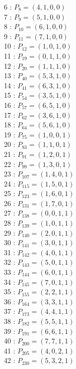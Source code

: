\documentclass{article}
\begin{document}
{\begin{multicols}{3}
6 : $P_{8}=( 4, 1, 0, 0 )$\\
7 : $P_{9}=( 5, 1, 0, 0 )$\\
8 : $P_{10}=( 6, 1, 0, 0 )$\\
9 : $P_{11}=( 7, 1, 0, 0 )$\\
10 : $P_{12}=( 1, 0, 1, 0 )$\\
11 : $P_{19}=( 0, 1, 1, 0 )$\\
12 : $P_{20}=( 1, 1, 1, 0 )$\\
13 : $P_{40}=( 5, 3, 1, 0 )$\\
14 : $P_{41}=( 6, 3, 1, 0 )$\\
15 : $P_{54}=( 3, 5, 1, 0 )$\\
16 : $P_{57}=( 6, 5, 1, 0 )$\\
17 : $P_{62}=( 3, 6, 1, 0 )$\\
18 : $P_{64}=( 5, 6, 1, 0 )$\\
19 : $P_{75}=( 1, 0, 0, 1 )$\\
20 : $P_{83}=( 1, 1, 0, 1 )$\\
21 : $P_{91}=( 1, 2, 0, 1 )$\\
22 : $P_{99}=( 1, 3, 0, 1 )$\\
23 : $P_{107}=( 1, 4, 0, 1 )$\\
24 : $P_{115}=( 1, 5, 0, 1 )$\\
25 : $P_{123}=( 1, 6, 0, 1 )$\\
26 : $P_{131}=( 1, 7, 0, 1 )$\\
27 : $P_{138}=( 0, 0, 1, 1 )$\\
28 : $P_{139}=( 1, 0, 1, 1 )$\\
29 : $P_{140}=( 2, 0, 1, 1 )$\\
30 : $P_{141}=( 3, 0, 1, 1 )$\\
31 : $P_{142}=( 4, 0, 1, 1 )$\\
32 : $P_{143}=( 5, 0, 1, 1 )$\\
33 : $P_{144}=( 6, 0, 1, 1 )$\\
34 : $P_{145}=( 7, 0, 1, 1 )$\\
35 : $P_{155}=( 2, 2, 1, 1 )$\\
36 : $P_{164}=( 3, 3, 1, 1 )$\\
37 : $P_{173}=( 4, 4, 1, 1 )$\\
38 : $P_{182}=( 5, 5, 1, 1 )$\\
39 : $P_{191}=( 6, 6, 1, 1 )$\\
40 : $P_{200}=( 7, 7, 1, 1 )$\\
41 : $P_{205}=( 4, 0, 2, 1 )$\\
42 : $P_{230}=( 5, 3, 2, 1 )$\\

\end{multicols}}
\end{document}
